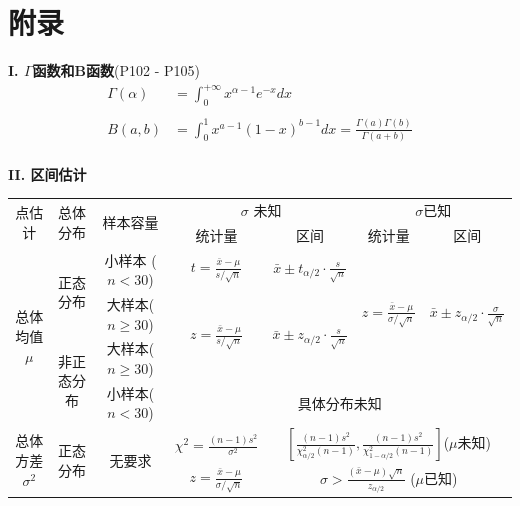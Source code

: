 \documentclass[a4paper]{ctexart}    %
\begin{document}
	\section{附录}
	\noindent
	\textbf{\large I. $ \Gamma $函数和B函数}(P102 - P105) \\
	\begin{equation*}
		\begin{split}
			\Gamma(\alpha) &= \int_{0}^{+\infty} x^{\alpha - 1}e^{-x}dx \\
			& \\
			B(a, b) &= \int_{0}^{1} x^{a-1}(1-x)^{b-1}dx = \frac{\Gamma(a)\Gamma(b)}{\Gamma(a+b)}
		\end{split}
	\end{equation*} \\
	\textbf{\large II. 区间估计}
	\begin{table}[htbp!]
		\centering
		\renewcommand\arraystretch{1.8}
		\begin{tabular}{|c|c|c|c|c|c|c|}
			\hline
			\multirow{2}{*}{点估计} & \multirow{2}{*}{总体分布} & \multirow{2}{*}{样本容量} & \multicolumn{2}{|c|}{$\sigma$ 未知} & \multicolumn{2}{|c|}{$\sigma$已知} \\
			\cline{4-7}
			& & & 统计量 & 区间 & 统计量 & 区间 \\ \hline
			\multirow{4}{*}{总体均值$\mu$} & \multirow{2}{*}{正态分布} & {小样本 ($ n < 30 $)} & $ t = \frac{\bar{x} - \mu}{s/\sqrt{n}} $ & $ \bar{x} \pm t_{\alpha/2} \cdot \frac{s}{\sqrt{n}} $ & \multirow{3}{*}{$ z=\frac{\bar{x}-\mu}{\sigma / \sqrt{n}} $} & \multirow{3}{*}{$ \bar{x} \pm z_{\alpha / 2} \cdot \frac{\sigma}{\sqrt{n}} $} \\
			\cline{3-5}
			& & 大样本($ n \geq 30 $) & \multirow{2}{*}{$ z= \frac{\bar{x}-\mu}{s/\sqrt{n}} $} & \multirow{2}{*}{$\bar{x} \pm z_{\alpha/2} \cdot \frac{s}{\sqrt{n}}$} & & \\
			\cline{2-3}
			 & \multirow{2}{*}{非正态分布} & 大样本($ n \geq 30 $) & & & & \\
			\cline{3-7}
			 & & 小样本($ n < 30 $) & \multicolumn{4}{|c|}{具体分布未知} \\
			\cline{1-7} 
			\multirow{2}{*}{总体方差$ \sigma^2 $} & \multirow{2}{*}{正态分布} & \multirow{2}{*}{无要求} & $ \chi^2 = \frac{(n-1)s^2}{\sigma^2} $ & \multicolumn{3}{|c|}{$ \left[ \frac{(n-1)s^2}{\chi_{\alpha / 2}^2(n-1)} , \frac{(n-1)s^2}{\chi_{1-\alpha / 2}^2(n-1)}\right] $\quad ($ \mu $未知)} \\
			\cline{4-7}
			& & & $ z = \frac{\bar{x} - \mu}{\sigma / \sqrt{n}} $ & \multicolumn{3}{|c|}{$ \sigma > \frac{(\bar{x} - \mu)\sqrt{n}}{z_{\alpha / 2}} $ \quad ($\mu$已知)} \\
			\cline{1-7}
		\end{tabular}
	\end{table} \\
\end{document}
